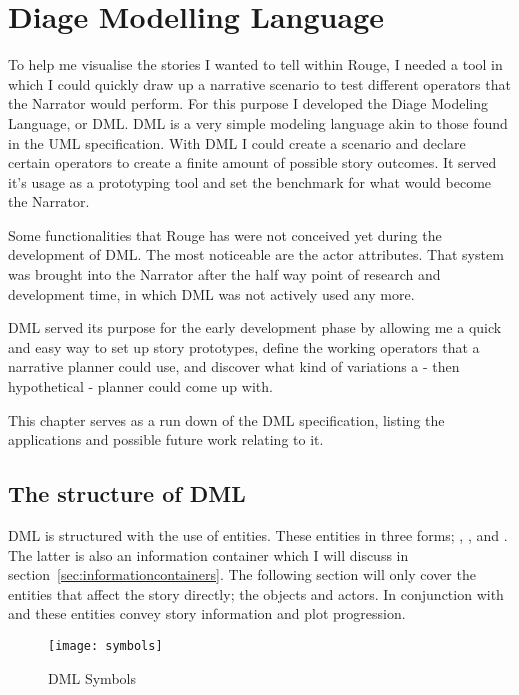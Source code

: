 \chapter{Diage Modelling Language}
\label{ch:dml}
To help me visualise the stories I wanted to tell within Rouge, I needed a tool in which I could quickly draw up a narrative scenario to test different operators that the Narrator would perform.
For this purpose I developed the Diage Modeling Language, or DML. 
DML is a very simple modeling language akin to those found in the UML specification.
With DML I could create a scenario and declare certain operators to create a finite amount of possible story outcomes. 
It served it's usage as a prototyping tool and set the benchmark for what would become the Narrator.

Some functionalities that Rouge has were not conceived yet during the development of DML. The most noticeable are the actor attributes.
That system was brought into the Narrator after the half way point of research and development time, in which DML was not actively used any more.

DML served its purpose for the early development phase by allowing me a quick and easy way to set up story prototypes, define the working operators that a narrative planner could use, and discover what kind of variations a - then hypothetical - planner could come up with.

This chapter serves as a run down of the DML specification, listing the applications and possible future work relating to it.

\section{The structure of DML}
DML is structured with the use of entities.
These entities in three forms; , , and .
The latter is also an information container which I will discuss in section~\ref{sec:informationcontainers}.
The following section will only cover the entities that affect the story directly; the objects and actors.
In conjunction with  and  these entities convey story information and plot progression.

\begin{figure}[p]
	\texttt{[image: symbols]}
	\caption{DML Symbols}
	\label{fig:DMLSymbols}	
\end{figure}


